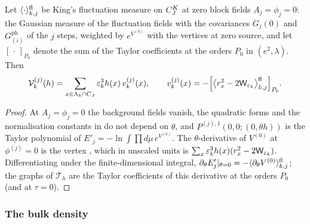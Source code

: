 \begin{lemma}\label{app:a04:lem:V}
Let $\langle\cdot\rangle^{\mathrm{fl}}_{k,j}$ be King's fluctuation measure \cite[(3.17)]{K1} on $C^{K}_{J}$ at zero block fields $A_j=\phi_j=0$: the Gaussian measure of the fluctuation fields with the covariances $G_j(0)$ and $G^{\mathrm{ph}}_{(i)}$ of the $j$ steps, weighted by $e^{V^{(0)}}$ with the vertices \cite[(3.18)--(3.26)]{K1} at zero source, and let $[\,\cdot\,]_{P_0}$ denote the sum of the Taylor coefficients at the orders $P_0$ in $(e^2,\lambda)$. Then
\begin{equation}\label{app:a04:eq:V}
\mathcal V^{(j)}_k(h)=\sum_{x\in\Lambda_k\cap C_J}\varepsilon_k^3h(x)\,v^{(j)}_k(x),\qquad v^{(j)}_k(x)=-\Big[\big\langle r_x^2-2\mathsf W_{\varepsilon_k}\big\rangle^{\mathrm{fl}}_{k,j}\Big]_{P_0}.
\end{equation}
\end{lemma}
\begin{proof}
At $A_j=\phi_j=0$ the background fields vanish, the quadratic forms and the normalisation constants in \cite[(3.14)]{K1} do not depend on $\theta$, and $P^{(j),1}(0,0;(0,\theta h))$ is the Taylor polynomial of $E'_j=-\ln\int\prod d\mu\,e^{V^{(0)}}$. The $\theta$-derivative of $V^{(0)}$ at $\phi^{(j)}=0$ is the vertex \cite[(3.21)]{K1}, which in unscaled units is $\sum_x\varepsilon_k^3h(x)(r_x^2-2\mathsf W_{\varepsilon_k})$. Differentiating under the finite-dimensional integral, $\partial_\theta E'_j|_{\theta=0}=-\langle\partial_\theta V^{(0)}\rangle^{\mathrm{fl}}_{k,j}$; the graphs of $\mathcal T_h$ are the Taylor coefficients of this derivative at the orders $P_0$ (and at $\tau=0$).
\end{proof}

\subsubsection{The bulk density}

